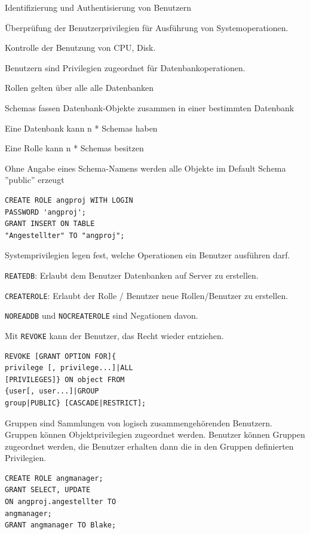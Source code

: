 \documentclass[10pt,landscape,a4paper]{scrartcl}
\newcommand{\drule}[3][0]{%
	\tikz[baseline]{\path[decoration={markings,
			mark=between positions 0 and 1 step 2*#3
			with {\node[fill, circle, minimum width=#3, inner sep=0pt, anchor=south west] {};}},postaction={decorate}]  (0,#1) -- ++(#2,0);}}
\begin{document}
\begin{multicols*}{5}
\begin{compactitem} [$\bullet$]
	\item Identifizierung und Authentisierung von Benutzern 
	\item Überprüfung der Benutzerprivilegien für Ausführung von Systemoperationen.
	\item Kontrolle der Benutzung von CPU, Disk.
\end{compactitem}
\textcolor{b}{Benutzern} sind Privilegien zugeordnet für Datenbankoperationen.
	\begin{compactitem}[$\bullet$]
	\item \textcolor{b}{Rollen} gelten über alle \textcolor{b}{alle Datenbanken}
	\item \textcolor{b}{Schemas} fassen \textcolor{b}{Datenbank-Objekte} \textcolor{b}{zusammen} in einer \textcolor{b}{bestimmten Datenbank}
	\item Eine \textcolor{b}{Datenbank} kann \textcolor{b}{n * Schemas} haben 
	\item Eine \textcolor{b}{Rolle} kann \textcolor{b}{n * Schemas} besitzen
	\item \textcolor{b}{Ohne Angabe} eines \textcolor{b}{Schema-Namens} werden \textcolor{b}{alle Objekte im Default Schema} ''public'' erzeugt
\end{compactitem}
\begin{lstlisting}
CREATE ROLE angproj WITH LOGIN 
PASSWORD 'angproj';
GRANT INSERT ON TABLE 
"Angestellter" TO "angproj"; 
\end{lstlisting}
\vspace{-10pt}
\drule{5.5cm}{1pt}
Systemprivilegien legen fest, welche Operationen ein Benutzer ausführen darf.
\begin{compactitem} [$\bullet$]
	\item \textcolor{b}{\texttt{REATEDB}}: Erlaubt dem Benutzer Datenbanken auf Server zu erstellen.
	\item \textcolor{b}{\texttt{CREATEROLE}}: Erlaubt der Rolle / Benutzer neue Rollen/Benutzer zu erstellen.
	\item \textcolor{b}{\texttt{NOREADDB}} und \textcolor{b}{\texttt{NOCREATEROLE}} sind Negationen davon.
\end{compactitem}
\vspace{-10pt}
\drule{5.5cm}{1pt}
Mit \textcolor{b}{\texttt{REVOKE}} kann der Benutzer,  das Recht wieder entziehen.
\begin{lstlisting}
REVOKE [GRANT OPTION FOR]{
privilege [, privilege...]|ALL 
[PRIVILEGES]} ON object FROM
{user[, user...]|GROUP 
group|PUBLIC} [CASCADE|RESTRICT];
\end{lstlisting}
\vspace{-10pt}
\drule{5.5cm}{1pt}
\textcolor{b}{Gruppen} sind \textcolor{b}{Sammlungen} von logisch \textcolor{b}{zusammengehörenden Benutzern}. Gruppen können \textcolor{b}{Objektprivilegien zugeordnet} werden. \textcolor{b}{Benutzer} können \textcolor{b}{Gruppen zugeordnet} werden, die Benutzer erhalten dann die \textcolor{b}{in den Gruppen definierten Privilegien}.
\begin{lstlisting}
CREATE ROLE angmanager;
GRANT SELECT, UPDATE
ON angproj.angestellter TO 
angmanager;
GRANT angmanager TO Blake; 
\end{lstlisting}
\columnbreak

\end{multicols*}
\end{document}
